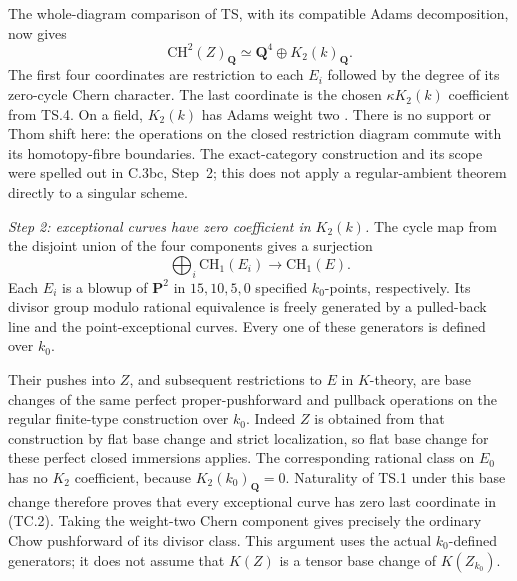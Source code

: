 The whole-diagram comparison of TS, with its compatible Adams
decomposition, now gives
\begin{equation}
 \mathrm{CH}^{2}(Z)_{\mathbf Q}
       \simeq \mathbf Q^4\oplus K_2(k)_{\mathbf Q}.
                                                        \tag{TC.2}
\end{equation}
The first four coordinates are restriction to each $E_i$ followed
by the degree of its zero-cycle Chern character.  The last coordinate
is the chosen $\kappa K_2(k)$ coefficient from TS.4.  On a field,
$K_2(k)$ has Adams weight two
\citep[Chapter~IV, Example~5.9.1, p.~51]{D_Weibel2013KbookIV}.
There is no support or Thom shift here: the operations on the closed
restriction diagram commute with its homotopy-fibre boundaries.
The exact-category construction and its scope were spelled out in
C.3bc, Step~2; this does not apply a regular-ambient theorem directly
to a singular scheme.

\emph{Step 2: exceptional curves have zero coefficient in $K_2(k)$.}
The cycle map from the disjoint union of the four components gives
a surjection
\[
             \bigoplus_i\mathrm{CH}_1(E_i)
                         \longrightarrow\mathrm{CH}_1(E).
\]
Each $E_i$ is a blowup of $\mathbf P^2$ in $15,10,5,0$ specified
$k_0$-points, respectively.  Its divisor group modulo rational
equivalence is freely generated by a pulled-back line and the
point-exceptional curves.  Every one of these generators is defined
over $k_0$.

Their pushes into $Z$, and subsequent restrictions to $E$ in
$K$-theory, are base changes of the same perfect proper-pushforward
and pullback operations on the regular finite-type construction
over $k_0$.  Indeed $Z$ is obtained from that construction by flat
base change and strict localization, so flat base change for these
perfect closed immersions applies.  The corresponding rational
class on $E_0$ has no $K_2$ coefficient, because
$K_2(k_0)_{\mathbf Q}=0$.  Naturality of TS.1 under this base change
therefore proves that every exceptional curve has zero last
coordinate in (TC.2).  Taking the weight-two Chern component gives
precisely the ordinary Chow pushforward of its divisor class.
This argument uses the actual $k_0$-defined generators; it does not
assume that $K(Z)$ is a tensor base change of $K(Z_{k_0})$.

